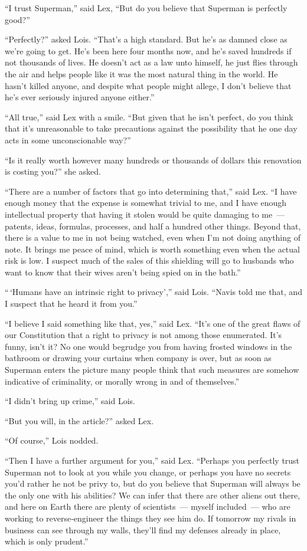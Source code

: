 ``I trust Superman,'' said Lex, ``But do you believe that Superman is
perfectly good?''

``Perfectly?'' asked Lois. ``That's a high standard. But he's as damned
close as we're going to get. He's been here four months now, and he's
saved hundreds if not thousands of lives. He doesn't act as a law unto
himself, he just flies through the air and helps people like it was the
most natural thing in the world. He hasn't killed anyone, and despite
what people might allege, I don't believe that he's ever seriously
injured anyone either.''

``All true,'' said Lex with a smile. ``But given that he isn't perfect,
do you think that it's unreasonable to take precautions against the
possibility that he one day acts in some unconscionable way?''

``Is it really worth however many hundreds or thousands of dollars this
renovation is costing you?'' she asked.

``There are a number of factors that go into determining that,'' said
Lex. ``I have enough money that the expense is somewhat trivial to me,
and I have enough intellectual property that having it stolen would be
quite damaging to me~--- patents, ideas, formulas, processes, and half a
hundred other things. Beyond that, there is a value to me in not being
watched, even when I'm not doing anything of note. It brings me peace of
mind, which is worth something even when the actual risk is low. I
suspect much of the sales of this shielding will go to husbands who want
to know that their wives aren't being spied on in the bath.''

``\,`Humans have an intrinsic right to privacy','' said Lois. ``Navis
told me that, and I suspect that he heard it from you.''

``I believe I said something like that, yes,'' said Lex. ``It's one of
the great flaws of our Constitution that a right to privacy is not among
those enumerated. It's funny, isn't it? No one would begrudge you from
having frosted windows in the bathroom or drawing your curtains when
company is over, but as soon as Superman enters the picture many people
think that such measures are somehow indicative of criminality, or
morally wrong in and of themselves.''

``I didn't bring up crime,'' said Lois.

``But you will, in the article?'' asked Lex.

``Of course,'' Lois nodded.

``Then I have a further argument for you,'' said Lex. ``Perhaps you
perfectly trust Superman not to look at you while you change, or perhaps
you have no secrets you'd rather he not be privy to, but do you believe
that Superman will always be the only one with his abilities? We can
infer that there are other aliens out there, and here on Earth there are
plenty of scientists~--- myself included~--- who are working to
reverse‐engineer the things they see him do. If tomorrow my rivals in
business can see through my walls, they'll find my defenses already in
place, which is only prudent.''

